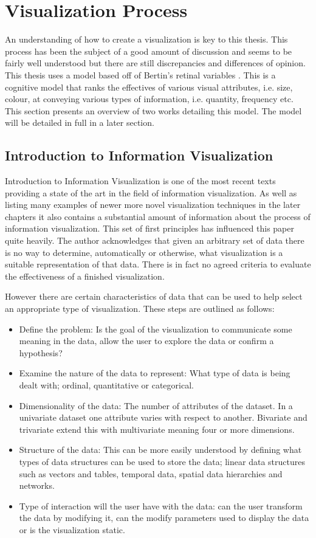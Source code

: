 \documentclass[a4paper, 11pt, titlepage, onehalfspacing]{report}
\begin{document}
	\section{Visualization Process}
An understanding of how to create a visualization is key to this thesis. This process has been the subject of a good amount of discussion and seems to be fairly well understood but there are still discrepancies and differences of opinion. This thesis uses a model based off of Bertin's retinal variables \cite{bertin1973semiologie}. This is a cognitive model that ranks the effectives of various visual attributes, i.e. size, colour, at conveying various types of information, i.e. quantity, frequency etc. This section presents an overview of two works detailing this model. The model will be detailed in full in a later section.


\subsection{Introduction to Information Visualization}
\label{Intro_to_info_vis}
Introduction to Information Visualization \cite{mazza2009introduction} is one of the most recent texts providing a state of the art in the field of information visualization. As well as listing many examples of newer more novel visualization techniques in the later chapters it also contains a substantial amount of information about the process of information visualization. This set of first principles has influenced this paper quite heavily. The author acknowledges that given an arbitrary set of data there is no way to determine, automatically or otherwise, what visualization is a suitable representation of that data. There is in fact no agreed criteria to evaluate the effectiveness of a finished visualization.

However there are certain characteristics of data that can be used to help select an appropriate type of visualization. These steps are outlined as follows:
\begin{itemize}
\item Define the problem: Is the goal of the visualization to communicate some meaning in the data, allow the user to explore the data or confirm a hypothesis?
\item Examine the nature of the data to represent: What type of data is being dealt with; ordinal, quantitative or categorical.
\item Dimensionality of the data: The number of attributes of the dataset. In a univariate dataset one attribute varies with respect to another. Bivariate and trivariate extend this with multivariate meaning four or more dimensions.
\item Structure of the data: This can be more easily understood by defining what types of data structures can be used to store the data; linear data structures such as vectors and tables, temporal data, spatial data hierarchies and networks.
\item Type of interaction will the user have with the data: can the user transform the data by modifying it, can the modify parameters used to display the data or is the visualization static.
\end{itemize}
\end{document}
